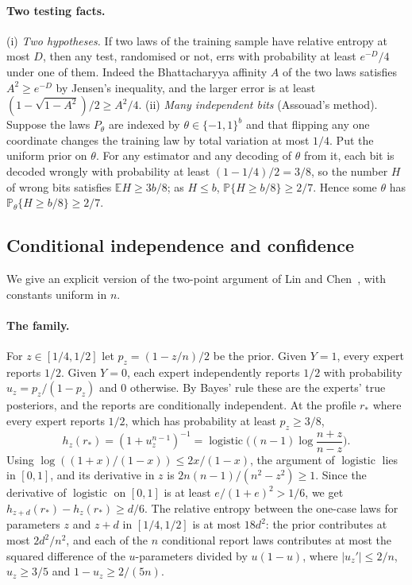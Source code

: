 \documentclass[11pt,a4paper]{article}
\theoremstyle{remark}
\newcommand{\E}{\mathbb E}
\newcommand{\PP}{\mathbb P}
\newcommand{\sig}{\operatorname{logistic}}
\begin{document}
\paragraph{Two testing facts.} (i) \emph{Two hypotheses.} If two laws of the training sample have relative entropy at most $D$, then any test, randomised or not, errs with probability at least $e^{-D}/4$ under one of them. Indeed the Bhattacharyya affinity $A$ of the two laws satisfies $A^2\ge e^{-D}$ by Jensen's inequality, and the larger error is at least $(1-\sqrt{1-A^2})/2\ge A^2/4$. (ii) \emph{Many independent bits} (Assouad's method). Suppose the laws $P_\theta$ are indexed by $\theta\in\{-1,1\}^b$ and that flipping any one coordinate changes the training law by total variation at most $1/4$. Put the uniform prior on $\theta$. For any estimator and any decoding of $\theta$ from it, each bit is decoded wrongly with probability at least $(1-1/4)/2=3/8$, so the number $H$ of wrong bits satisfies $\E H\ge3b/8$; as $H\le b$, $\PP\{H\ge b/8\}\ge2/7$. Hence some $\theta$ has $\PP_\theta\{H\ge b/8\}\ge2/7$.

\subsection{Conditional independence and confidence}\label{sec:conf}
We give an explicit version of the two-point argument of Lin and Chen~\cite[Appendix~D.1]{lc}, with constants uniform in $n$.

\paragraph{The family.} For $z\in[1/4,1/2]$ let $p_z=(1-z/n)/2$ be the prior. Given $Y=1$, every expert reports $1/2$. Given $Y=0$, each expert independently reports $1/2$ with probability $u_z=p_z/(1-p_z)$ and $0$ otherwise. By Bayes' rule these are the experts' true posteriors, and the reports are conditionally independent. At the profile $r_*$ where every expert reports $1/2$, which has probability at least $p_z\ge3/8$,
\[
 h_z(r_*)=(1+u_z^{n-1})^{-1}
     =\sig\!\Big((n-1)\log\frac{n+z}{n-z}\Big).
\]
Using $\log((1+x)/(1-x))\le2x/(1-x)$, the argument of $\sig$ lies in $[0,1]$, and its derivative in $z$ is $2n(n-1)/(n^2-z^2)\ge1$. Since the derivative of $\sig$ on $[0,1]$ is at least $e/(1+e)^2>1/6$, we get $h_{z+d}(r_*)-h_z(r_*)\ge d/6$. The relative entropy between the one-case laws for parameters $z$ and $z+d$ in $[1/4,1/2]$ is at most $18d^2$: the prior contributes at most $2d^2/n^2$, and each of the $n$ conditional report laws contributes at most the squared difference of the $u$-parameters divided by $u(1-u)$, where $|u_z'|\le2/n$, $u_z\ge3/5$ and $1-u_z\ge2/(5n)$.
\end{document}
